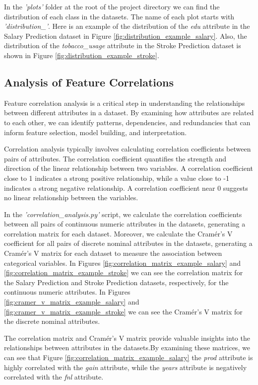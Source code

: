 \documentclass[runningheads]{paper}
\begin{document}
In the \textit{'plots'} folder at the root of the project directory we can find
the distribution of each class in the datasets. The name of each plot starts
with \textit{'distribution\_'}. Here is an example of the distribution of the
\textit{edu} attribute in the Salary Prediction dataset in Figure
\ref{fig:distribution_example_salary}. Also, the distribution of the
\textit{tobacco\_usage} attribute in the Stroke Prediction dataset is shown in
Figure \ref{fig:distribution_example_stroke}.

\subsection{Analysis of Feature Correlations}
Feature correlation analysis is a critical step in understanding the relationships
between different attributes in a dataset. By examining how attributes are related
to each other, we can identify patterns, dependencies, and redundancies that can
inform feature selection, model building, and interpretation.

Correlation analysis typically involves calculating correlation coefficients
between pairs of attributes. The correlation coefficient quantifies the strength
and direction of the linear relationship between two variables. A correlation
coefficient close to 1 indicates a strong positive relationship, while a value
close to -1 indicates a strong negative relationship. A correlation coefficient
near 0 suggests no linear relationship between the variables.

In the \textit{'correlation\_analysis.py'} script, we calculate the correlation
coefficients between all pairs of continuous numeric attributes in the datasets,
generating a correlation matrix for each dataset. Moreover, we calculate the 
Cramér's V coefficient for all pairs of discrete nominal attributes in the datasets,
generating a Cramér's V matrix for each dataset to measure the association between
categorical variables. In Figures \ref{fig:correlation_matrix_example_salary} and
\ref{fig:correlation_matrix_example_stroke} we can see the correlation matrix for
the Salary Prediction and Stroke Prediction datasets, respectively, for the continuous
numeric attributes. In Figures \ref{fig:cramer_v_matrix_example_salary} and
\ref{fig:cramer_v_matrix_example_stroke} we can see the Cramér's V matrix for
the discrete nominal attributes.

The correlation matrix and Cramér's V matrix provide valuable insights into the
relationships between attributes in the datasets.By examining these matrices, we
can see that Figure \ref{fig:correlation_matrix_example_salary} the \textit{prod}
attribute is highly correlated with the \textit{gain} attribute, while the
\textit{years} attribute is negatively correlated with the \textit{fnl} attribute.
\end{document}
